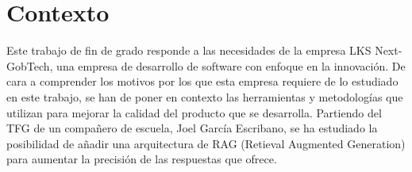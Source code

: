 \section{Contexto}

Este trabajo de fin de grado responde a las necesidades de la empresa LKS Next-GobTech, una empresa de desarrollo de software con enfoque en la innovación. De cara a comprender los motivos por los que esta empresa requiere de lo estudiado en este trabajo, se han de poner en contexto las herramientas y metodologías que utilizan para mejorar la calidad del producto que se desarrolla. Partiendo del TFG de un compañero de escuela, Joel García Escribano, se ha estudiado la posibilidad de añadir una arquitectura de RAG (Retieval Augmented Generation) para aumentar la precisión de las respuestas que ofrece.



